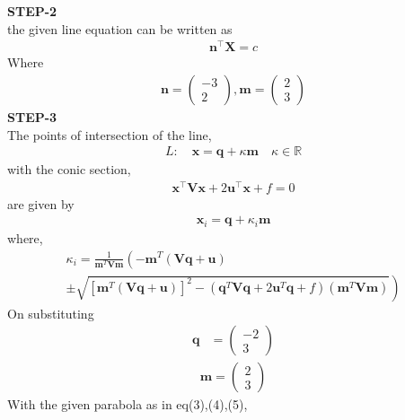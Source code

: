 \documentclass[10pt,a4paper]{report}
\newcommand{\myvec}[1]{\ensuremath{\begin{pmatrix}#1\end{pmatrix}}}
\let\vec\mathbf
\let\vec\mathbf
\providecommand{\brak}[1]{\ensuremath{\left(#1\right)}}
\providecommand{\lbrak}[1]{\ensuremath{\left(#1\right.}}
\providecommand{\rbrak}[1]{\ensuremath{\left.#1\right)}}
\providecommand{\sbrak}[1]{\ensuremath{{}\left[#1\right]}}
\begin{document}
\begin{multicols}{2}
\textbf{STEP-2}\vspace{2mm}\\
the given line equation can be written as\\ 
\begin{align} 
	\vec{n}^{\top}\vec{X}=c
\end{align}
Where
\begin{align}
\vec{n}=\myvec{-3\\2},\vec{m}=\myvec{2\\3}
\end{align}
\textbf{STEP-3}\vspace{2mm}\\
The points of intersection of the line, \\ 
\begin{align}
L: \quad \vec{x} = \vec{q} + \kappa \vec{m} \quad \kappa \in \mathbb{R}
\end{align}
with the conic section, \\ 
\begin{align}
	\vec{x}^{\top}\vec{V}\vec{x} + 2\vec{u}^{\top} \vec{x} + f = 0
\end{align}
are given by \\
\begin{align}
\vec{x}_i = \vec{q} + \kappa_i \vec{m}
\end{align}
where, \\
{\tiny
\begin{multline}
\kappa_i = \frac{1}
{
\vec{m}^T\vec{V}\vec{m}
}
\lbrak{-\vec{m}^T\brak{\vec{V}\vec{q}+\vec{u}}}
\\
\pm
\rbrak{\sqrt{
\sbrak{
\vec{m}^T\brak{\vec{V}\vec{q}+\vec{u}}
}^2
-
\brak
{
\vec{q}^T\vec{V}\vec{q} + 2\vec{u}^T\vec{q} +f
}
\brak{\vec{m}^T\vec{V}\vec{m}}
}
}
\end{multline}
}
On substituting\\
\begin{align}
\vec{q} &= \myvec{
-2\\
3
} 
\end{align}
\begin{align}
\vec{m} = \myvec{2 \\ 3}
\end{align}
With the given parabola as in eq(3),(4),(5),\\ 


\end{multicols}
\end{document}
